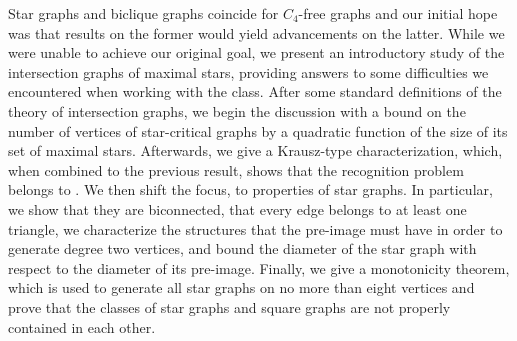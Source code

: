 Star graphs and biclique graphs coincide for $C_4$-free graphs and our initial hope was that results on the former would yield advancements on the latter.
While we were unable to achieve our original goal, we present an introductory study of the intersection graphs of maximal stars, providing answers to some difficulties we encountered when working with the class.
After some standard definitions of the theory of intersection graphs, we begin the discussion with a bound on the number of vertices of star-critical graphs by a quadratic function of the size of its set of maximal stars.
Afterwards, we give a Krausz-type characterization, which, when combined to the previous result, shows that the recognition problem belongs to \NP.
We then shift the focus, to properties of star graphs.
In particular, we show that they are biconnected, that every edge belongs to at least one triangle, we characterize the structures that the pre-image must have in order to generate degree two vertices, and bound the diameter of the star graph with respect to the diameter of its pre-image.
Finally, we give a monotonicity theorem, which is used to generate all star graphs on no more than eight vertices and prove that the classes of star graphs and square graphs are not properly contained in each other.






